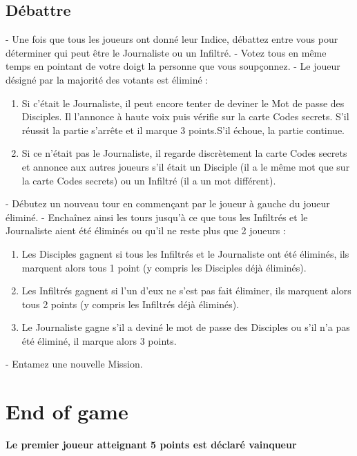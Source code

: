\documentclass{article}%
\begin{document}
%
\subsection{ Débattre
}%
\label{subsec:Dbattre}%
{-} Une fois que tous les joueurs ont donné leur Indice, débattez entre vous pour déterminer qui peut être le Journaliste ou un Infiltré.
%
{-} Votez tous en même temps en pointant de votre doigt la personne que vous soupçonnez.
%
{-} Le joueur désigné par la majorité des votants est éliminé :
%
\begin{enumerate}%
\item%
 Si c’était le Journaliste, il peut encore tenter de deviner le Mot de passe des Disciples. Il l'annonce à haute voix puis vérifie sur la carte Codes secrets. S’il réussit la partie s’arrête et il marque 3 points.S’il échoue, la partie continue.
%
\item%
 Si ce n’était pas le Journaliste, il regarde discrètement la carte Codes secrets et annonce aux autres joueurs s’il était un Disciple (il a le même mot que sur la carte Codes secrets) ou un Infiltré (il a un mot différent).
%
\end{enumerate}%
{-} Débutez un nouveau tour en commençant par le joueur à gauche du joueur éliminé.
%
{-} Enchaînez ainsi les tours jusqu’à ce que tous les Infiltrés et le Journaliste aient été éliminés ou qu’il ne reste plus que 2 joueurs :
%
\begin{enumerate}%
\item%
 Les Disciples gagnent si tous les Infiltrés et le Journaliste ont été éliminés, ils marquent alors tous 1 point (y compris les Disciples déjà éliminés).
%
\item%
 Les Infiltrés gagnent si l'un d'eux ne s'est pas fait éliminer, ils marquent alors tous 2 points (y compris les Infiltrés déjà éliminés).
%
\item%
 Le Journaliste gagne s'il a deviné le mot de passe des Disciples ou s'il n'a pas été éliminé, il marque alors 3 points.
%
\end{enumerate}%
{-} Entamez une nouvelle Mission.


%
\section{ End of game
}%
\label{sec:Endofgame}%
\textbf{Le premier joueur atteignant 5 points est déclaré vainqueur}

%
\end{document}
